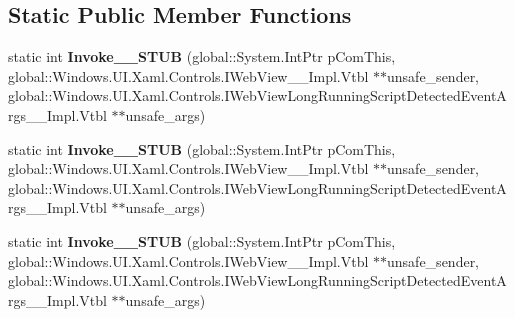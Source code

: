 \subsection*{Static Public Member Functions}
\begin{DoxyCompactItemize}
\item 
\mbox{\label{struct_windows_1_1_foundation_1_1_typed_event_handler___a___windows___u_i___xaml___controls___we097668b3f317b53d2adba6098dff8aa2_a9736832796537f0a592e0db4627b256d}} 
static int {\bfseries Invoke\+\_\+\+\_\+\+S\+T\+UB} (global\+::\+System.\+Int\+Ptr p\+Com\+This, global\+::\+Windows.\+U\+I.\+Xaml.\+Controls.\+I\+Web\+View\+\_\+\+\_\+\+Impl.\+Vtbl $\ast$$\ast$unsafe\+\_\+sender, global\+::\+Windows.\+U\+I.\+Xaml.\+Controls.\+I\+Web\+View\+Long\+Running\+Script\+Detected\+Event\+Args\+\_\+\+\_\+\+Impl.\+Vtbl $\ast$$\ast$unsafe\+\_\+args)
\item 
\mbox{\label{struct_windows_1_1_foundation_1_1_typed_event_handler___a___windows___u_i___xaml___controls___we097668b3f317b53d2adba6098dff8aa2_a9736832796537f0a592e0db4627b256d}} 
static int {\bfseries Invoke\+\_\+\+\_\+\+S\+T\+UB} (global\+::\+System.\+Int\+Ptr p\+Com\+This, global\+::\+Windows.\+U\+I.\+Xaml.\+Controls.\+I\+Web\+View\+\_\+\+\_\+\+Impl.\+Vtbl $\ast$$\ast$unsafe\+\_\+sender, global\+::\+Windows.\+U\+I.\+Xaml.\+Controls.\+I\+Web\+View\+Long\+Running\+Script\+Detected\+Event\+Args\+\_\+\+\_\+\+Impl.\+Vtbl $\ast$$\ast$unsafe\+\_\+args)
\item 
\mbox{\label{struct_windows_1_1_foundation_1_1_typed_event_handler___a___windows___u_i___xaml___controls___we097668b3f317b53d2adba6098dff8aa2_a9736832796537f0a592e0db4627b256d}} 
static int {\bfseries Invoke\+\_\+\+\_\+\+S\+T\+UB} (global\+::\+System.\+Int\+Ptr p\+Com\+This, global\+::\+Windows.\+U\+I.\+Xaml.\+Controls.\+I\+Web\+View\+\_\+\+\_\+\+Impl.\+Vtbl $\ast$$\ast$unsafe\+\_\+sender, global\+::\+Windows.\+U\+I.\+Xaml.\+Controls.\+I\+Web\+View\+Long\+Running\+Script\+Detected\+Event\+Args\+\_\+\+\_\+\+Impl.\+Vtbl $\ast$$\ast$unsafe\+\_\+args)

\end{DoxyCompactItemize}
